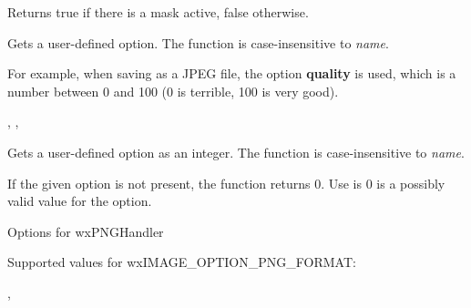 \label{wximagehasmask}


Returns true if there is a mask active, false otherwise.


\label{wximagegetoption}


Gets a user-defined option. The function is case-insensitive to {\it name}.

For example, when saving as a JPEG file, the option {\bf quality} is
used, which is a number between 0 and 100 (0 is terrible, 100 is very good).


,\rtfsp
{},\rtfsp
{}


\label{wximagegetoptionint}


Gets a user-defined option as an integer. The function is case-insensitive to {\it name}.

If the given option is not present, the function returns $0$. Use 
 is $0$ is a possibly valid value
for the option.

Options for wxPNGHandler
\twocolwidtha{5cm}%
\begin{twocollist}
\end{twocollist}

Supported values for wxIMAGE\_OPTION\_PNG\_FORMAT:
\twocolwidtha{5cm}%
\begin{twocollist}
\end{twocollist}



,\rtfsp
{}


\label{wximagehasoption}

